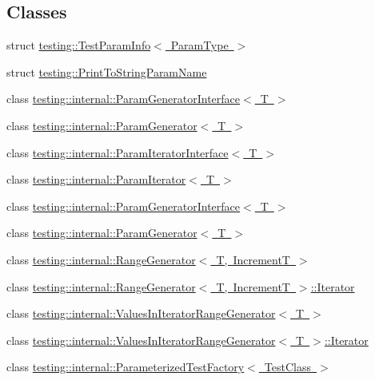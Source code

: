 \subsection*{Classes}
\begin{DoxyCompactItemize}
\item 
struct \mbox{\hyperlink{structtesting_1_1_test_param_info}{testing\+::\+Test\+Param\+Info$<$ Param\+Type $>$}}
\item 
struct \mbox{\hyperlink{structtesting_1_1_print_to_string_param_name}{testing\+::\+Print\+To\+String\+Param\+Name}}
\item 
class \mbox{\hyperlink{classtesting_1_1internal_1_1_param_generator_interface}{testing\+::internal\+::\+Param\+Generator\+Interface$<$ T $>$}}
\item 
class \mbox{\hyperlink{classtesting_1_1internal_1_1_param_generator}{testing\+::internal\+::\+Param\+Generator$<$ T $>$}}
\item 
class \mbox{\hyperlink{classtesting_1_1internal_1_1_param_iterator_interface}{testing\+::internal\+::\+Param\+Iterator\+Interface$<$ T $>$}}
\item 
class \mbox{\hyperlink{classtesting_1_1internal_1_1_param_iterator}{testing\+::internal\+::\+Param\+Iterator$<$ T $>$}}
\item 
class \mbox{\hyperlink{classtesting_1_1internal_1_1_param_generator_interface}{testing\+::internal\+::\+Param\+Generator\+Interface$<$ T $>$}}
\item 
class \mbox{\hyperlink{classtesting_1_1internal_1_1_param_generator}{testing\+::internal\+::\+Param\+Generator$<$ T $>$}}
\item 
class \mbox{\hyperlink{classtesting_1_1internal_1_1_range_generator}{testing\+::internal\+::\+Range\+Generator$<$ T, Increment\+T $>$}}
\item 
class \mbox{\hyperlink{classtesting_1_1internal_1_1_range_generator_1_1_iterator}{testing\+::internal\+::\+Range\+Generator$<$ T, Increment\+T $>$\+::\+Iterator}}
\item 
class \mbox{\hyperlink{classtesting_1_1internal_1_1_values_in_iterator_range_generator}{testing\+::internal\+::\+Values\+In\+Iterator\+Range\+Generator$<$ T $>$}}
\item 
class \mbox{\hyperlink{classtesting_1_1internal_1_1_values_in_iterator_range_generator_1_1_iterator}{testing\+::internal\+::\+Values\+In\+Iterator\+Range\+Generator$<$ T $>$\+::\+Iterator}}
\item 
class \mbox{\hyperlink{classtesting_1_1internal_1_1_parameterized_test_factory}{testing\+::internal\+::\+Parameterized\+Test\+Factory$<$ Test\+Class $>$}}

\end{DoxyCompactItemize}
